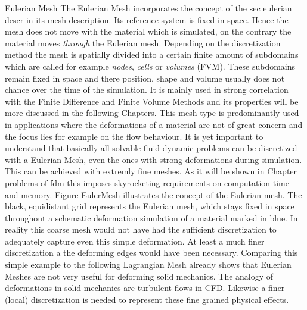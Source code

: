 Eulerian Mesh
The Eulerian Mesh incorporates the concept of the sec eulerian descr in its mesh description. Its reference system is fixed in space. Hence the mesh does not move
with the material which is simulated, on the contrary the material moves \emph{through} the Eulerian mesh. Depending on the discretization method the mesh is spatially divided into a certain finite amount of subdomains which are called for example \emph{nodes}, \emph{cells} or \emph{volumes} (FVM). These subdomains remain fixed in space and there position, shape and volume usually does not chance over the time of the simulation. It is mainly used in strong correlation with the Finite Difference and Finite Volume Methods and its properties will be more discussed in the following Chapters. This mesh type is predominantly used in applications where the deformations of a material are not of great concern and the focus lies for example on the flow behaviour. It is yet important to understand that basically all solvable fluid dynamic problems can be discretized with a Eulerian Mesh, even the ones with strong deformations during simulation. This can be achieved with extremly fine meshes. As it will be shown in Chapter problems of fdm this imposes skyrocketing requirements on computation time and memory. Figure EulerMesh illustrates the concept of the Eulerian mesh.
The black, equidistant grid represents the Eulerian mesh, which stays fixed in space throughout a schematic deformation simulation of a material marked in blue. In reality
this coarse mesh would not have had the sufficient discretization to adequately capture even this simple deformation. At least a much finer discretization a the deforming edges would have been necessary. Comparing this simple example to the following Lagrangian Mesh already shows that Eulerian Meshes are not very useful for deforming solid mechanics. The analogy of deformations in solid mechanics are turbulent flows in CFD. Likewise a finer (local) discretization is needed to represent these fine grained physical effects.

